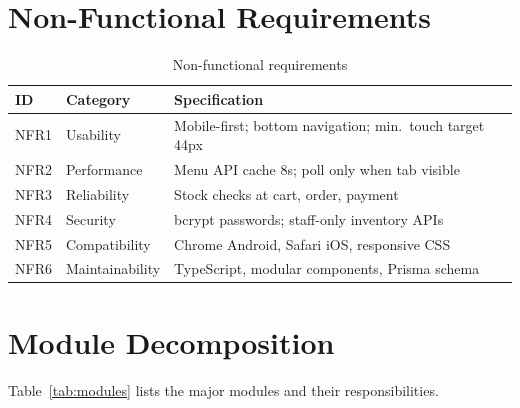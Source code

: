 \section{Non-Functional Requirements}
\begin{table}[H]
  \centering
  \caption{Non-functional requirements}
  \tablebodysetup
  \begin{tabularx}{\textwidth}{@{}l l Y@{}}
    \toprule
    \textbf{ID} & \textbf{Category} & \textbf{Specification} \\
    \midrule
    NFR1 & Usability & Mobile-first; bottom navigation; min.\ touch target 44px \\
    NFR2 & Performance & Menu API cache 8s; poll only when tab visible \\
    NFR3 & Reliability & Stock checks at cart, order, payment \\
    NFR4 & Security & bcrypt passwords; staff-only inventory APIs \\
    NFR5 & Compatibility & Chrome Android, Safari iOS, responsive CSS \\
    NFR6 & Maintainability & TypeScript, modular components, Prisma schema \\
    \bottomrule
  \end{tabularx}
\end{table}

\section{Module Decomposition}
Table~\ref{tab:modules} lists the major modules and their responsibilities.

